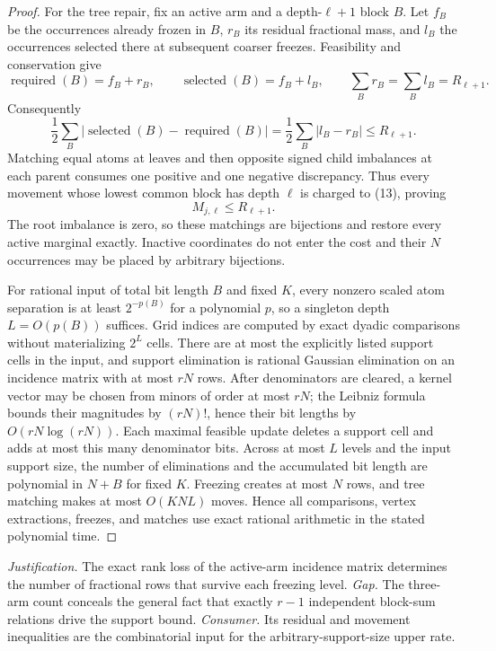 \documentclass{article}
\begin{document}
\begin{proof}
For the tree repair, fix an active arm and a depth-\(\ell+1\) block \(B\).  Let \(f_B\) be the occurrences already frozen in \(B\), \(r_B\) its residual fractional mass, and \(l_B\) the occurrences selected there at subsequent coarser freezes.  Feasibility and conservation give
\[
 \operatorname{required}(B)=f_B+r_B,\qquad
 \operatorname{selected}(B)=f_B+l_B,\qquad
 \sum_Br_B=\sum_Bl_B=R_{\ell+1}. \tag{12}
\]
Consequently
\[
 \frac12\sum_B|\operatorname{selected}(B)-\operatorname{required}(B)|
 =\frac12\sum_B|l_B-r_B|\le R_{\ell+1}. \tag{13}
\]
Matching equal atoms at leaves and then opposite signed child imbalances at each parent consumes one positive and one negative discrepancy.  Thus every movement whose lowest common block has depth \(\ell\) is charged to (13), proving
\[
 M_{j,\ell}\le R_{\ell+1}. \tag{14}
\]
The root imbalance is zero, so these matchings are bijections and restore every active marginal exactly.  Inactive coordinates do not enter the cost and their \(N\) occurrences may be placed by arbitrary bijections.

For rational input of total bit length \(B\) and fixed \(K\), every nonzero scaled atom separation is at least \(2^{-p(B)}\) for a polynomial \(p\), so a singleton depth \(L=O(p(B))\) suffices.  Grid indices are computed by exact dyadic comparisons without materializing \(2^L\) cells.  There are at most the explicitly listed support cells in the input, and support elimination is rational Gaussian elimination on an incidence matrix with at most \(rN\) rows.  After denominators are cleared, a kernel vector may be chosen from minors of order at most \(rN\); the Leibniz formula bounds their magnitudes by \((rN)!\), hence their bit lengths by \(O(rN\log(rN))\).  Each maximal feasible update deletes a support cell and adds at most this many denominator bits.  Across at most \(L\) levels and the input support size, the number of eliminations and the accumulated bit length are polynomial in \(N+B\) for fixed \(K\).  Freezing creates at most \(N\) rows, and tree matching makes at most \(O(KNL)\) moves.  Hence all comparisons, vertex extractions, freezes, and matches use exact rational arithmetic in the stated polynomial time.
\end{proof}
\par\smallskip\noindent \textit{Justification.} The exact rank loss of the active-arm incidence matrix determines the number of fractional rows that survive each freezing level. \textit{Gap.} The three-arm count conceals the general fact that exactly \(r-1\) independent block-sum relations drive the support bound. \textit{Consumer.} Its residual and movement inequalities are the combinatorial input for the arbitrary-support-size upper rate.
\end{document}
